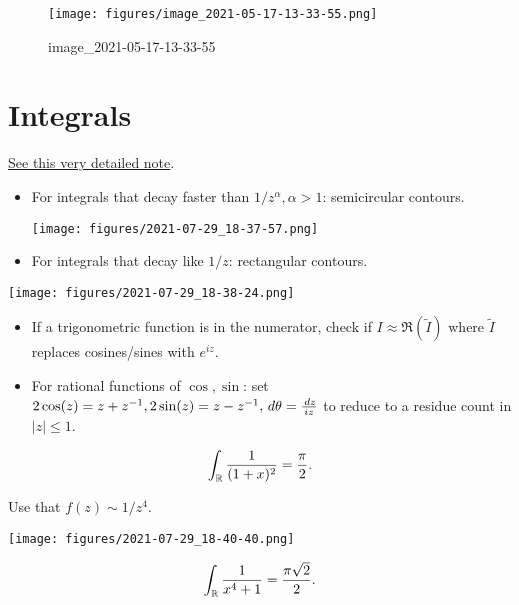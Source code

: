 \begin{figure}
\centering
\texttt{[image: figures/image\_2021-05-17-13-33-55.png]}
\caption{image\_2021-05-17-13-33-55}
\end{figure}

\hypertarget{integrals-1}{%
\section{Integrals}\label{integrals-1}}

\href{https://math.mit.edu/~jorloff/18.04/notes/topic9.pdf}{See this
very detailed note}.

\begin{itemize}
\item
  For integrals that decay faster than \(1/z^\alpha, \alpha>1\):
  semicircular contours.

  \texttt{[image: figures/2021-07-29\_18-37-57.png]}
\item
  For integrals that decay like \(1/z\): rectangular contours.
\end{itemize}

\texttt{[image: figures/2021-07-29\_18-38-24.png]}

\begin{itemize}
\item
  If a trigonometric function is in the numerator, check if
  \(I \approx \Re(\tilde I)\) where \(\tilde I\) replaces cosines/sines
  with \(e^{iz}\).
\item
  For rational functions of \(\cos, \sin\): set
  \(2\cos(z) = z + z^{-1}, 2\sin(z) = z - z^{-1}, \,d\theta= {\,dz\over iz}\)
  to reduce to a residue count in
  \({\left\lvert {z} \right\rvert} \leq 1\).
\end{itemize}

\begin{exercise}[?]

\begin{align*}
\int_{\mathbb{R}}{1 \over (1+x)^2} = {\pi \over 2}
.\end{align*}

Use that \(f(z) \sim 1/z^4\).

\end{exercise}

\begin{solution}

\texttt{[image: figures/2021-07-29\_18-40-40.png]}

\end{solution}

\begin{exercise}[?]

\begin{align*}
\int_{\mathbb{R}}{1 \over x^4 + 1} = {\pi \sqrt{2} \over 2}
.\end{align*}

\end{exercise}

